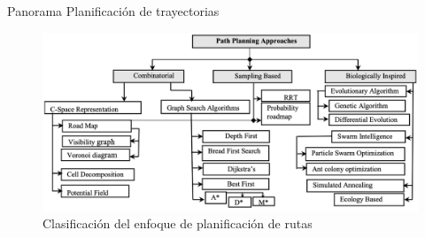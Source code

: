 \documentclass[
	12pt, %
	aspectratio=169, %
]{beamer}
\begin{document}


\begin{frame}{Panorama Planificación de trayectorias}
  \begin{figure}
    \centering
    \includegraphics[scale=0.33]{path_planning_panorama}
    \caption[Caption for LOF]{Clasificación del enfoque de planificación de rutas\footnotemark}
  \end{figure}
  
\end{frame}
\end{document}
